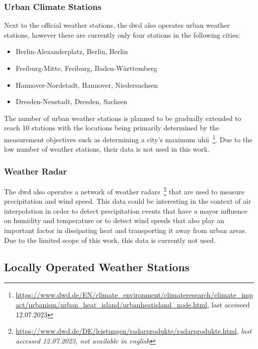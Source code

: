 \subsubsection{Urban Climate Stations}

Next to the official weather stations, the \gls{dwd} also operates urban weather stations, however there are currently only four stations in the following cities:

\begin{itemize}
    \item Berlin-Alexanderplatz, Berlin, Berlin
    \item Freiburg-Mitte, Freiburg, Baden-Württemberg
    \item Hannover-Nordstadt, Hannover, Niedersachsen
    \item Dresden-Neustadt, Dresden, Sachsen
\end{itemize}

The number of urban weather stations is planned to be gradually extended to reach 10 stations with the locations being primarily determined by the measurement objectives such as determining a city's maximum \gls{uhii}~\footnote{\url{https://www.dwd.de/EN/climate\_environment/climateresearch/climate\_impact/urbanism/urban\_heat\_island/urbanheatisland\_node.html}, last accessed 12.07.2023}. Due to the low number of weather stations, their data is not used in this work.

\subsubsection{Weather Radar}

The \gls{dwd} also operates a network of weather radars~\footnote{\url{https://www.dwd.de/DE/leistungen/radarprodukte/radarprodukte.html}, \textit{last accessed 12.07.2023, not available in english}} that are used to measure precipitation and wind speed. This data could be interesting in the context of air interpolation in order to detect precipitation events that have a mayor influence on humidity and temperature or to detect wind speeds that also play an important factor in dissipating heat and transporting it away from urban areas. Due to the limited scope of this work, this data is currently not used.

\subsection{Locally Operated Weather Stations}

